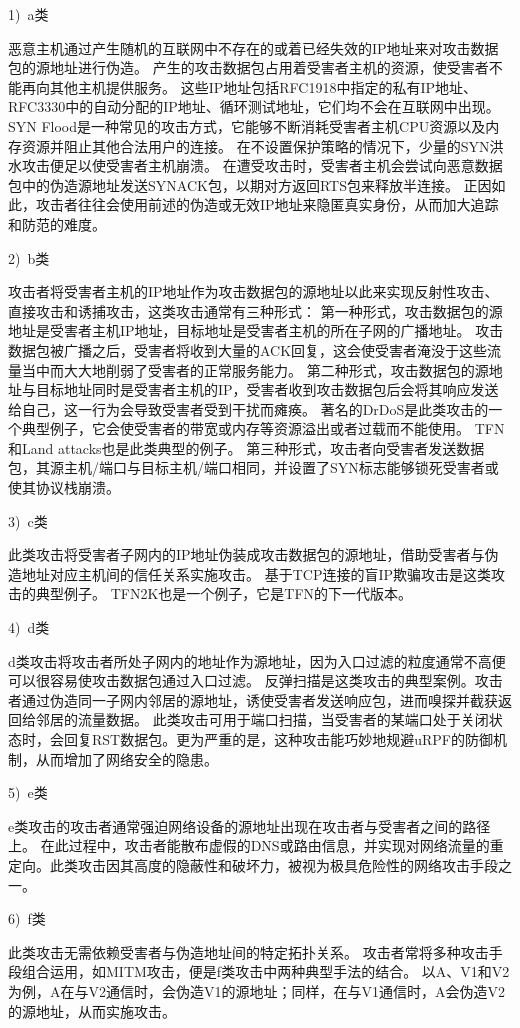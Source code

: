1)~a类\par
恶意主机通过产生随机的互联网中不存在的或着已经失效的IP地址来对攻击数据包的源地址进行伪造。
产生的攻击数据包占用着受害者主机的资源，使受害者不能再向其他主机提供服务。
这些IP地址包括RFC1918中指定的私有IP地址、RFC3330中的自动分配的IP地址、循环测试地址，它们均不会在互联网中出现。
SYN Flood\cite{rahouti2021synguard,dimolianis2021syn}是一种常见的攻击方式，它能够不断消耗受害者主机CPU资源以及内存资源并阻止其他合法用户的连接。
在不设置保护策略的情况下，少量的SYN洪水攻击便足以使受害者主机崩溃。
在遭受攻击时，受害者主机会尝试向恶意数据包中的伪造源地址发送SYNACK包，以期对方返回RTS包来释放半连接。
正因如此，攻击者往往会使用前述的伪造或无效IP地址来隐匿真实身份，从而加大追踪和防范的难度。\par
2)~b类\par
攻击者将受害者主机的IP地址作为攻击数据包的源地址以此来实现反射性攻击、直接攻击和诱捕攻击，这类攻击通常有三种形式：
第一种形式，攻击数据包的源地址是受害者主机IP地址，目标地址是受害者主机的所在子网的广播地址。
攻击数据包被广播之后，受害者将收到大量的ACK回复，这会使受害者淹没于这些流量当中而大大地削弱了受害者的正常服务能力。
第二种形式，攻击数据包的源地址与目标地址同时是受害者主机的IP，受害者收到攻击数据包后会将其响应发送给自己，这一行为会导致受害者受到干扰而瘫痪。
著名的DrDoS\cite{baik2020multi,nuiaa2022comprehensive}是此类攻击的一个典型例子，它会使受害者的带宽或内存等资源溢出或者过载而不能使用。
TFN\cite{brooks2021distributed}和Land  attacks\cite{CERT1997}也是此类典型的例子。
第三种形式，攻击者向受害者发送数据包，其源主机/端口与目标主机/端口相同，并设置了SYN标志能够锁死受害者或使其协议栈崩溃。\par
3)~c类\par
此类攻击将受害者子网内的IP地址伪装成攻击数据包的源地址，借助受害者与伪造地址对应主机间的信任关系实施攻击。
基于TCP连接的盲IP欺骗攻击\cite{fonseca2021identifying}是这类攻击的典型例子。
TFN2K\cite{singh2020study}也是一个例子，它是TFN的下一代版本。\par
4)~d类\par
d类攻击将攻击者所处子网内的地址作为源地址，因为入口过滤的粒度通常不高便可以很容易使攻击数据包通过入口过滤。
反弹扫描\cite{CERT1997}是这类攻击的典型案例。攻击者通过伪造同一子网内邻居的源地址，诱使受害者发送响应包，进而嗅探并截获返回给邻居的流量数据。
此类攻击可用于端口扫描，当受害者的某端口处于关闭状态时，会回复RST数据包\cite{kaur2023comparative}。更为严重的是，这种攻击能巧妙地规避uRPF\cite{dhilipan2023detection}的防御机制，从而增加了网络安全的隐患。\par
5)~e类\par
e类攻击的攻击者通常强迫网络设备的源地址出现在攻击者与受害者之间的路径上。
在此过程中，攻击者能散布虚假的DNS或路由信息，并实现对网络流量的重定向\cite{Huang2006}。此类攻击因其高度的隐蔽性和破坏力，被视为极具危险性的网络攻击手段之一。\par
6)~f类\par
此类攻击无需依赖受害者与伪造地址间的特定拓扑关系。
攻击者常将多种攻击手段组合运用，如MITM攻击\cite{schrottenloher2023simplified}，便是f类攻击中两种典型手法的结合。
以A、V1和V2为例，A在与V2通信时，会伪造V1的源地址；同样，在与V1通信时，A会伪造V2的源地址，从而实施攻击。\par

